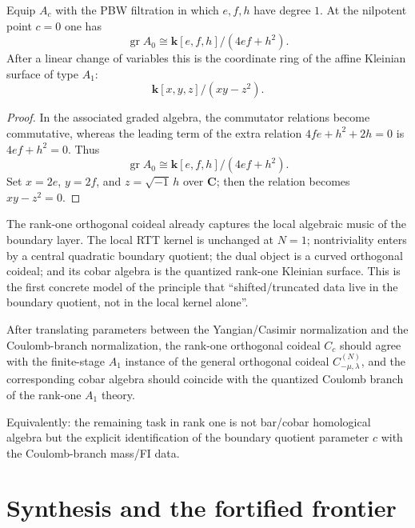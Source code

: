 \begin{corollary}
\label{cor:kleinian-associated-graded}
Equip $A_c$ with the PBW filtration in which $e,f,h$ have degree $1$. At the
nilpotent point $c=0$ one has
\[
\operatorname{gr}A_0
\cong
\mathbf{k}[e,f,h]/(4ef+h^2).
\]
After a linear change of variables this is the coordinate ring of the affine
Kleinian surface of type $A_1$:
\[
\mathbf{k}[x,y,z]/(xy-z^2).
\]
\end{corollary}

\begin{proof}
In the associated graded algebra, the commutator relations become commutative,
whereas the leading term of the extra relation $4fe+h^2+2h=0$ is
$4ef+h^2=0$. Thus
\[
\operatorname{gr}A_0\cong \mathbf{k}[e,f,h]/(4ef+h^2).
\]
Set $x=2e$, $y=2f$, and $z=\sqrt{-1}\,h$ over $\mathbf{C}$; then the relation
becomes $xy-z^2=0$.
\end{proof}

\begin{remark}[Interpretation]
\label{rem:rank-one-interpretation}
The rank-one orthogonal coideal already captures the local algebraic music of
the boundary layer. The local RTT kernel is unchanged at $N=1$;
nontriviality enters by a central quadratic boundary quotient; the dual object is
a curved orthogonal coideal; and its cobar algebra is the quantized rank-one
Kleinian surface. This is the first concrete model of the principle that
``shifted/truncated data live in the boundary quotient, not in the local kernel
alone''.
\end{remark}

\begin{conjecture}
\label{conj:rank-one-bfn-matching}
After translating parameters between the Yangian/Casimir normalization and the
Coulomb-branch normalization, the rank-one orthogonal coideal $C_c$ should agree
with the finite-stage $A_1$ instance of the general orthogonal coideal
$C_{-\mu,\lambda}^{(N)}$, and the corresponding cobar algebra should coincide
with the quantized Coulomb branch of the rank-one $A_1$ theory.

Equivalently: the remaining task in rank one is not bar/cobar homological
algebra but the explicit identification of the boundary quotient parameter $c$
with the Coulomb-branch mass/FI data.
\end{conjecture}

\section{Synthesis and the fortified frontier}
\label{sec:synthesis-fortified-frontier}

